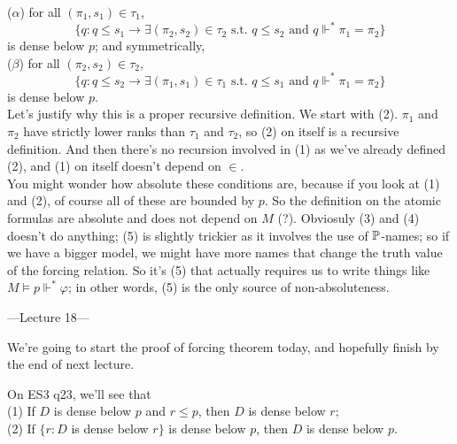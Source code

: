 \documentclass[a4paper]{article}
\begin{document}
\begin{defi}
($\alpha$) for all $(\pi_1,s_1) \in \tau_1$,
\[
\{q: q \leq s_1 \to \exists (\pi_2,s_2) \in \tau_2 \text{ s.t. } q \leq s_2 \text{ and } q \Vdash^* \pi_1 = \pi_2\}
\]
is dense below $p$; and symmetrically,\\
($\beta$) for all $(\pi_2,s_2) \in \tau_2$,
\[
\{q: q \leq s_2 \to \exists (\pi_1,s_1) \in \tau_1 \text{ s.t. }q \leq s_1 \text{ and } q \Vdash^* \pi_1 = \pi_2\}
\]
is dense below $p$.\\
Let's justify why this is a proper recursive definition. We start with (2). $\pi_1$ and $\pi_2$ have strictly lower ranks than $\tau_1$ and $\tau_2$, so (2) on itself is a recursive definition. And then there's no recursion involved in (1) as we've already defined (2), and (1) on itself doesn't depend on $\in$.\\
You might wonder how absolute these conditions are, because if you look at (1) and (2), of course all of these are bounded by $p$. So the definition on the atomic formulas are absolute and does not depend on $M$ (?). Obviosuly (3) and (4) doesn't do anything; (5) is slightly trickier as it involves the use of $\P$-names; so if we have a bigger model, we might have more names that change the truth value of the forcing relation. So it's (5) that actually requires us to write things like $M \vDash p \Vdash^*\varphi$; in other words, (5) is the only source of non-absoluteness.
\end{defi}

---Lecture 18---

We're going to start the proof of forcing theorem today, and hopefully finish by the end of next lecture.

On ES3 q23, we'll see that\\
(1) If $D$ is dense below $p$ and $r \leq p$, then $D$ is dense below $r$;\\
(2) If $\{r:D$ is dense below $r\}$ is dense below $p$, then $D$ is dense below $p$.
\end{document}
